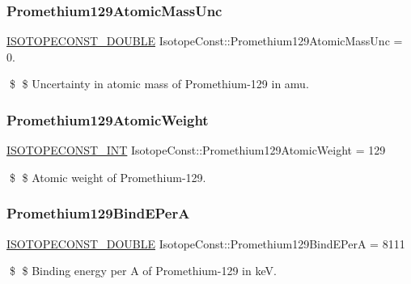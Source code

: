 \subsubsection{\texorpdfstring{Promethium129\+Atomic\+Mass\+Unc}{Promethium129AtomicMassUnc}}
{\footnotesize\ttfamily \mbox{\hyperlink{group___isotope_const-_macros_ga8f45a7272ce02c0b4c65c44636ed719a}{I\+S\+O\+T\+O\+P\+E\+C\+O\+N\+S\+T\+\_\+\+D\+O\+U\+B\+LE}} Isotope\+Const\+::\+Promethium129\+Atomic\+Mass\+Unc = 0.}

\$ \$ Uncertainty in atomic mass of Promethium-\/129 in amu. \mbox{\label{group___isotope_const-_promethium-_pm129_ga7c5deafad2425d2f3ef417974d19545e}} 
\subsubsection{\texorpdfstring{Promethium129\+Atomic\+Weight}{Promethium129AtomicWeight}}
{\footnotesize\ttfamily \mbox{\hyperlink{group___isotope_const-_macros_ga5f18360b3e99483a35c32d789e62621c}{I\+S\+O\+T\+O\+P\+E\+C\+O\+N\+S\+T\+\_\+\+I\+NT}} Isotope\+Const\+::\+Promethium129\+Atomic\+Weight = 129}

\$ \$ Atomic weight of Promethium-\/129. \mbox{\label{group___isotope_const-_promethium-_pm129_ga9fa7185920b573657bbef3524f8a8bf5}} 
\subsubsection{\texorpdfstring{Promethium129\+Bind\+E\+PerA}{Promethium129BindEPerA}}
{\footnotesize\ttfamily \mbox{\hyperlink{group___isotope_const-_macros_ga8f45a7272ce02c0b4c65c44636ed719a}{I\+S\+O\+T\+O\+P\+E\+C\+O\+N\+S\+T\+\_\+\+D\+O\+U\+B\+LE}} Isotope\+Const\+::\+Promethium129\+Bind\+E\+PerA = 8111}

\$ \$ Binding energy per A of Promethium-\/129 in keV. \mbox{\label{group___isotope_const-_promethium-_pm129_ga8b84e95c1382df18eb71d8507811c325}} 
